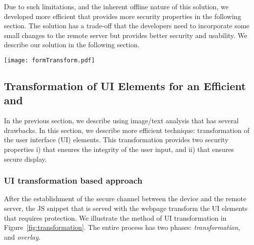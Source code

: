 Due to such limitations, and the inherent offline nature of this solution, we developed more efficient \poa that provides more security properties in the following section. The solution has a trade-off that the developers need to incorporate some small changes to the remote server but provides better security and usability. We describe our solution in the following section.


\begin{figure*}[t]
\centering
\texttt{[image: formTransform.pdf]}
\caption{\textbf{Transformation of UI elements.} Automated transformation of the UI elements (\one) by the \name JavaScript snippets that detects the presence of the device. The corresponding \html source shows the UI elements that requires integrity/privacy protection. These UI elements are transformed into a QR code (\two). The QR code encodes a UI specification that recreates the transformed UI. Specification~\ref{snippet:UISpecification} shows the corresponding UI specification that is created by the \name \js code. The QR code is then decoded and overlaid (\three) on the HDMI stream by the \device. Upon the user's action on the overlaid UI elements, the device signs all the input data and send them to the remote server. As the rendered UI is generated and overlaid by the \device, it also ensures the integrity of the UI elements. Note that the intermediate QR code transformation (\two) is not visible by the user as it is decoded instantaneously by the device.}
\label{fig:transformation}
\end{figure*}


\subsection{Transformation of UI Elements for an Efficient \Poa and \Poui}
\label{sec:systemDesign:transformation}

In the previous section, we describe \poa using image/text analysis that has several drawbacks. In this section, we describe more efficient technique: transformation of the user interface (UI) elements. This transformation provides two security properties i) \poa that ensures the integrity of the user input, and ii) \poui that ensures secure display.


\subsubsection{UI transformation based approach} After the establishment of the secure channel between the device and the remote server, the \name JS snippet that is served with the webpage transform the UI elements that requires protection. We illustrate the method of UI transformation in Figure~\ref{fig:transformation}. The entire process has two phases: \emph{transformation}, and \emph{overlay}.



